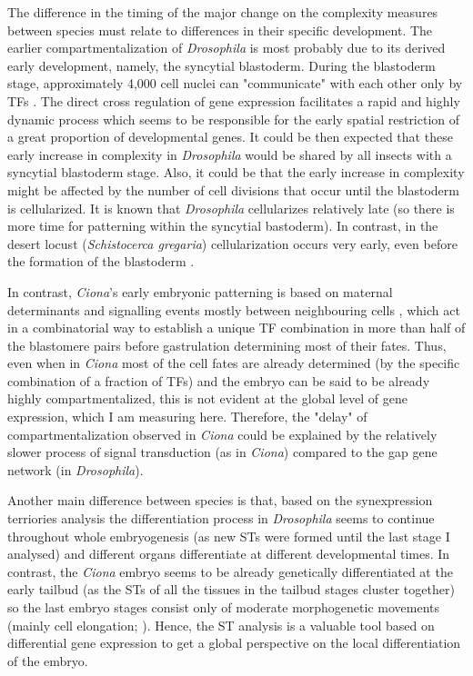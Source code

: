 The difference in the timing of the major change on the complexity measures between species must relate to differences in their specific development.
The earlier compartmentalization of \textit{Drosophila} is most probably due to its derived early development, namely, the syncytial blastoderm. 
During the blastoderm stage, approximately 4,000 cell nuclei can "communicate" with each other only by TFs \citep{Jaeger2011}. The direct cross regulation of gene expression facilitates a rapid and highly dynamic process which seems to be responsible for the early spatial restriction of a great proportion of developmental genes.
It could be then expected that these early increase in complexity in \textit{Drosophila} would be shared by all insects with a syncytial blastoderm stage. Also, it could be that the early increase in complexity might be affected by the number of cell divisions that occur until the blastoderm is cellularized. It is known that \textit{Drosophila} cellularizes relatively late (so there is more time for patterning within the syncytial bastoderm). In contrast, in the desert locust (\textit{Schistocerca gregaria}) cellularization occurs very early, even before the formation of the blastoderm \citep{Ho1997}.

In contrast,  \textit{Ciona}'s early embryonic patterning is based on maternal determinants and signalling events mostly between neighbouring cells \citep{Lemaire2009}, which act in a combinatorial way \citep{Hudson2007} to establish a unique TF combination in more than half of the blastomere pairs before gastrulation \citep{Imai2006} determining most of their fates.
Thus, even when in \textit{Ciona} most of the cell fates are already determined (by the specific combination of a fraction of TFs) and the embryo can be said to be already highly compartmentalized, this is not evident at the global level of gene expression, which I am measuring here.
Therefore, the "delay" of compartmentalization observed in \textit{Ciona} could be explained by the relatively slower process of signal transduction (as in \textit{Ciona}) compared to the gap gene network (in \textit{Drosophila}).

Another main difference between species is that, based on the synexpression terriories analysis the differentiation process in \textit{Drosophila} seems to continue throughout whole embryogenesis (as new STs were formed until the last stage I analysed) and different organs differentiate at different developmental times.
In contrast, the \textit{Ciona} embryo seems to be already genetically differentiated at the early tailbud (as the STs of all the tissues in the tailbud stages cluster together) so the last embryo stages consist only of moderate morphogenetic movements (mainly cell elongation; \citealp{Hotta2007}).
Hence, the ST analysis is a valuable tool based on differential gene expression to get a global perspective on the local differentiation of the embryo.

